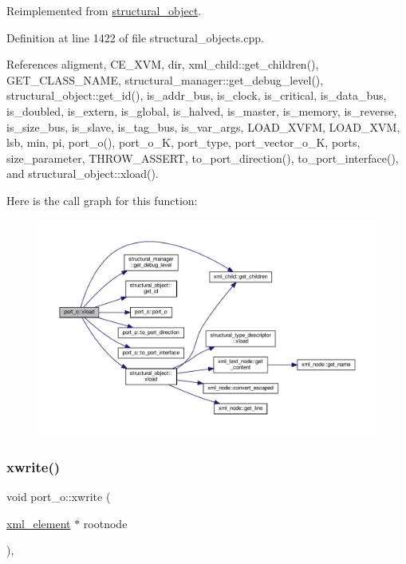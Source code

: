 Reimplemented from \hyperlink{classstructural__object_a9a964af7fe7e95b34d03bb514756bb33}{structural\+\_\+object}.



Definition at line 1422 of file structural\+\_\+objects.\+cpp.



References aligment, C\+E\+\_\+\+X\+VM, dir, xml\+\_\+child\+::get\+\_\+children(), G\+E\+T\+\_\+\+C\+L\+A\+S\+S\+\_\+\+N\+A\+ME, structural\+\_\+manager\+::get\+\_\+debug\+\_\+level(), structural\+\_\+object\+::get\+\_\+id(), is\+\_\+addr\+\_\+bus, is\+\_\+clock, is\+\_\+critical, is\+\_\+data\+\_\+bus, is\+\_\+doubled, is\+\_\+extern, is\+\_\+global, is\+\_\+halved, is\+\_\+master, is\+\_\+memory, is\+\_\+reverse, is\+\_\+size\+\_\+bus, is\+\_\+slave, is\+\_\+tag\+\_\+bus, is\+\_\+var\+\_\+args, L\+O\+A\+D\+\_\+\+X\+V\+FM, L\+O\+A\+D\+\_\+\+X\+VM, lsb, min, pi, port\+\_\+o(), port\+\_\+o\+\_\+K, port\+\_\+type, port\+\_\+vector\+\_\+o\+\_\+K, ports, size\+\_\+parameter, T\+H\+R\+O\+W\+\_\+\+A\+S\+S\+E\+RT, to\+\_\+port\+\_\+direction(), to\+\_\+port\+\_\+interface(), and structural\+\_\+object\+::xload().

Here is the call graph for this function\+:
\nopagebreak
\begin{figure}[H]
\begin{center}
\leavevmode
\includegraphics[width=350pt]{df/d75/structport__o_a9171abd4248f683208298310ce0c0faf_cgraph}
\end{center}
\end{figure}
\mbox{\label{structport__o_a134c66609a971e40a34dfdea50eb57dd}} 
\subsubsection{\texorpdfstring{xwrite()}{xwrite()}}
{\footnotesize\ttfamily void port\+\_\+o\+::xwrite (\begin{DoxyParamCaption}\item[{\hyperlink{classxml__element}{xml\+\_\+element} $\ast$}]{rootnode }\end{DoxyParamCaption})\hspace{0.3cm}{\ttfamily [override]}, {\ttfamily [virtual]}}




